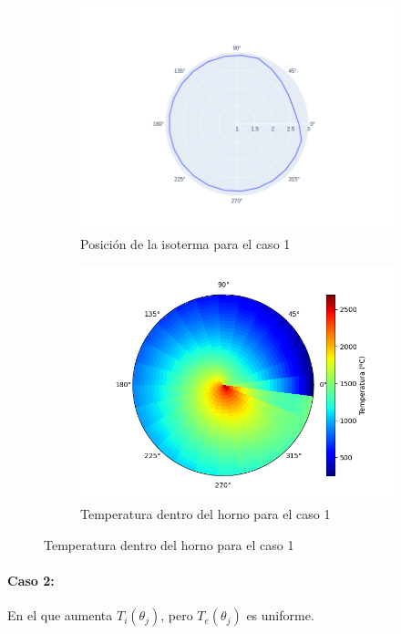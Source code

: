 \documentclass[12pt]{article}
\begin{document}
\begin{figure}[H]
\centering
\begin{subfigure}{0.5\textwidth}
  \includegraphics[scale=0.4]{uniform.0.isotherm}
  \caption{Posición de la isoterma para el caso 1}
\end{subfigure}%
\begin{subfigure}{0.5\textwidth}
  \includegraphics[scale=0.5]{uniform.0.temperature}
  \caption{Temperatura dentro del horno para el caso 1}
\end{subfigure}
\label{fig:uniform.0}
\end{figure}

\paragraph{Caso 2:} En el que aumenta \(T_i(\theta_j)\), pero \(T_e(\theta_{j})\) es uniforme.
\end{document}
